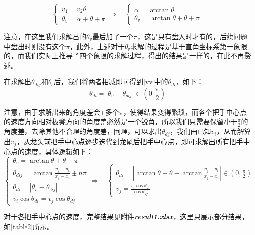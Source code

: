 \documentclass[withoutpreface,bwprint]{cumcmthesis} %
\begin{document}
\begin{equation}
\begin{cases}
    v_1 = v_2\theta\\
    \theta_v = \alpha + \theta + \pi
\end{cases}
\Rightarrow
\quad
\begin{cases}
    \alpha = \arctan\theta\\
    \theta_v = \arctan\theta + \theta + \pi
\end{cases}
\label{eq14}
\end{equation}

注意，在这里我们求解出的$\theta_v$最后加了一个$\pi$，这是只有盘入时才有的，后续问题中盘出时则没有这个$\pi$，此外，上述对于$\theta_v$求解的过程是基于直角坐标系第一象限的，而我们实际上推导了四个象限的求解过程，得出的结果是一样的，在此不再赘述。

在求解出$\theta_{dij}$和$\theta_v$后，我们将两者相减即可得到\cref{vv}中的$\theta_{di}$，如下：
\begin{equation}
\theta_{di} = |\theta_v - \theta_{dij}| \in (0,\frac{\pi}{2})
\label{eq15}
\end{equation}

注意，由于求解出来的角度差会$\mp$多个$\pi$，使得结果变得繁琐，而各个把手中心点的速度方向相对板凳方向的角度差必然是一个锐角，所以我们只需要保留小于$\frac{\pi}{2}$的角度差，去除其他不合理的角度差，同理，可以求出$\theta_{dj}$，我们由已知$v_i$，从而解算出$v_j$，从龙头前把手中心点逐步迭代到龙尾后把手中心点，即可求解出所有把手中心点的速度，具体逻辑如下：
\begin{equation}
\begin{cases}
    \theta_v = \arctan\theta + \theta + \pi\\
    \theta_{dij} = \arctan{\frac{y_j-y_i}{x_j-x_i}}\pm n\pi\\
    \theta_{di} = |\theta_v - \theta_{dij}|\\
    v_i\cos{\theta_{di}} = v_j\cos{\theta_{dj}}
\end{cases}
\Rightarrow
\quad
\begin{cases}
    \theta_{di} = |\arctan\theta + \theta - \arctan{\frac{y_j-y_i}{x_j-x_i}}| \in (0,\frac{\pi}{2})\\
    v_j = \frac{v_i\cos{\theta_{di}}}{\cos{\theta_{dj}}}
\end{cases}
\label{eq16}
\end{equation}

对于各把手中心点的速度，完整结果见附件\textbf{\textit{result1.xlsx}}，这里只展示部分结果，如\cref{table2}所示。
\end{document}
